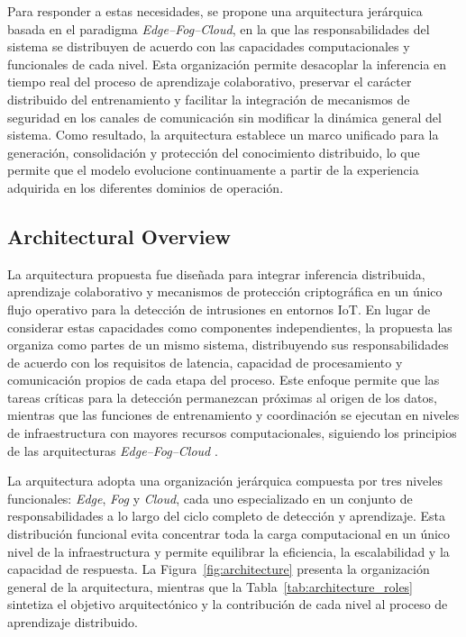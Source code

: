 \documentclass[journal,article,submit,moreauthors]{Definitions/mdpi}
\begin{document}
Para responder a estas necesidades, se propone una arquitectura jerárquica basada en el paradigma \textit{Edge--Fog--Cloud}, en la que las responsabilidades del sistema se distribuyen de acuerdo con las capacidades computacionales y funcionales de cada nivel. Esta organización permite desacoplar la inferencia en tiempo real del proceso de aprendizaje colaborativo, preservar el carácter distribuido del entrenamiento y facilitar la integración de mecanismos de seguridad en los canales de comunicación sin modificar la dinámica general del sistema. Como resultado, la arquitectura establece un marco unificado para la generación, consolidación y protección del conocimiento distribuido, lo que permite que el modelo evolucione continuamente a partir de la experiencia adquirida en los diferentes dominios de operación.

\subsection{Architectural Overview}
La arquitectura propuesta fue diseñada para integrar inferencia distribuida, aprendizaje colaborativo y mecanismos de protección criptográfica en un único flujo operativo para la detección de intrusiones en entornos IoT. En lugar de considerar estas capacidades como componentes independientes, la propuesta las organiza como partes de un mismo sistema, distribuyendo sus responsabilidades de acuerdo con los requisitos de latencia, capacidad de procesamiento y comunicación propios de cada etapa del proceso. Este enfoque permite que las tareas críticas para la detección permanezcan próximas al origen de los datos, mientras que las funciones de entrenamiento y coordinación se ejecutan en niveles de infraestructura con mayores recursos computacionales, siguiendo los principios de las arquitecturas \textit{Edge--Fog--Cloud} \cite{SaravanaBalaji2023,Wang2019,Ficco2024}.

La arquitectura adopta una organización jerárquica compuesta por tres niveles funcionales: \textit{Edge}, \textit{Fog} y \textit{Cloud}, cada uno especializado en un conjunto de responsabilidades a lo largo del ciclo completo de detección y aprendizaje. Esta distribución funcional evita concentrar toda la carga computacional en un único nivel de la infraestructura y permite equilibrar la eficiencia, la escalabilidad y la capacidad de respuesta. La Figura~\ref{fig:architecture} presenta la organización general de la arquitectura, mientras que la Tabla~\ref{tab:architecture_roles} sintetiza el objetivo arquitectónico y la contribución de cada nivel al proceso de aprendizaje distribuido.
\end{document}
